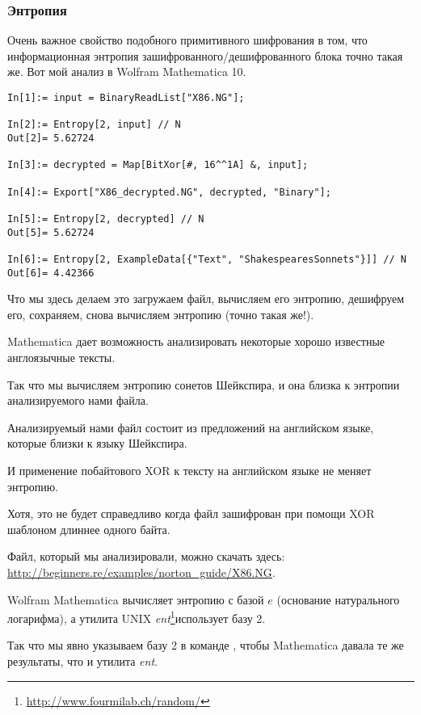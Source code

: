 \subsubsection{Энтропия}

Очень важное свойство подобного примитивного шифрования в том, что информационная энтропия
зашифрованного/дешифрованного блока точно такая же.
Вот мой анализ в Wolfram Mathematica 10.

\begin{lstlisting}[caption=Wolfram Mathematica 10,style=custommath]
In[1]:= input = BinaryReadList["X86.NG"];

In[2]:= Entropy[2, input] // N
Out[2]= 5.62724

In[3]:= decrypted = Map[BitXor[#, 16^^1A] &, input];

In[4]:= Export["X86_decrypted.NG", decrypted, "Binary"];

In[5]:= Entropy[2, decrypted] // N
Out[5]= 5.62724

In[6]:= Entropy[2, ExampleData[{"Text", "ShakespearesSonnets"}]] // N
Out[6]= 4.42366
\end{lstlisting}

Что мы здесь делаем это загружаем файл, вычисляем его энтропию, дешифруем его, сохраняем, снова вычисляем энтропию (точно такая же!).

Mathematica дает возможность анализировать некоторые хорошо известные англоязычные тексты.

Так что мы вычисляем энтропию сонетов Шейкспира, и она близка к энтропии анализируемого нами файла.

Анализируемый нами файл состоит из предложений на английском языке, которые близки к языку
Шейкспира.

И применение побайтового XOR к тексту на английском языке не меняет энтропию.


Хотя, это не будет справедливо когда файл зашифрован при помощи XOR шаблоном длиннее одного байта.

Файл, который мы анализировали, можно скачать здесь: \url{http://beginners.re/examples/norton_guide/X86.NG}.


\newcommand{\FNENTURL}{\footnote{\url{http://www.fourmilab.ch/random/}}}

Wolfram Mathematica вычисляет энтропию с базой $e$ (основание натурального логарифма),
а утилита UNIX \emph{ent}\FNENTURL использует базу 2.

Так что мы явно указываем базу 2 в команде , чтобы Mathematica давала те же результаты, что и утилита \emph{ent}.
